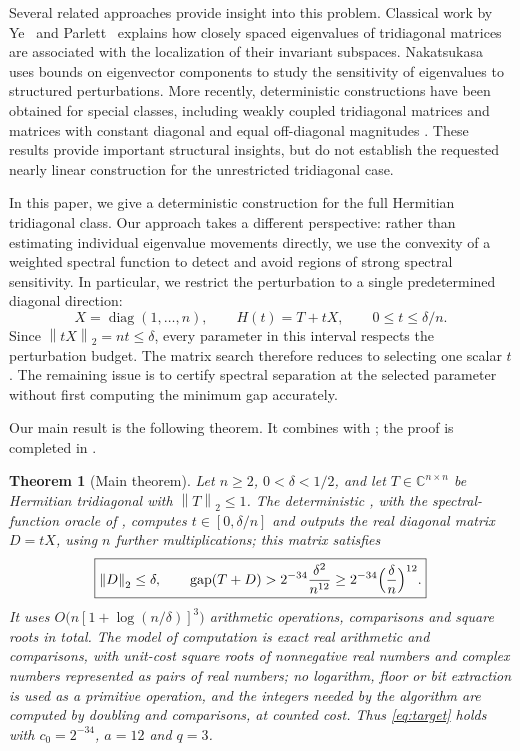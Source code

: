 \documentclass[10pt,a4paper]{article}
\newtheorem{theorem}{Theorem}[section]
\newcommand{\norm}[1]{\left\lVert #1\right\rVert}
\DeclareMathOperator{\gap}{gap}
\DeclareMathOperator{\diag}{diag}
\newcommand{\C}{\mathbb C}
\begin{document}
Several related approaches provide insight into this problem.
Classical work by Ye~\cite{Ye1995} and
Parlett~\cite{Parlett1996} explains how closely spaced
eigenvalues of tridiagonal matrices are associated with
the localization of their invariant subspaces.
Nakatsukasa~\cite{Nakatsukasa2012} uses bounds on
eigenvector components to study the sensitivity of
eigenvalues to structured perturbations.
More recently, deterministic constructions have been
obtained for special classes, including weakly coupled
tridiagonal matrices and matrices with constant diagonal
and equal off-diagonal magnitudes
\cite{CatalogueKE02}. These results provide important
structural insights, but do not establish the requested
nearly linear construction for the unrestricted
tridiagonal case.

In this paper, we give a deterministic construction for
the full Hermitian tridiagonal class. Our approach takes
a different perspective: rather than estimating individual
eigenvalue movements directly, we use the convexity of a
weighted spectral function to detect and avoid regions of
strong spectral sensitivity.
In particular, we restrict the perturbation to a
single predetermined diagonal direction:
\begin{equation}\label{eq:tilt}
\boxed{
X=\diag(1,\ldots,n),\qquad
H(t)=T+tX,\qquad 0\leq t\leq\delta/n.
}
\end{equation}
Since $\norm{tX}_2=nt\leq\delta$, every parameter in this
interval respects the perturbation budget. The matrix
search therefore reduces to selecting one scalar $t$.
The remaining issue is to certify spectral separation at
the selected parameter without first computing the
minimum gap accurately.

Our main result is the following theorem. It combines
 with ; the proof is
completed in .

\begin{theorem}[Main theorem]\label{thm:main}
Let $n\geq2$, $0<\delta<1/2$, and let $T\in\C^{n\times n}$ be
Hermitian tridiagonal with $\norm{T}_2\leq1$.
The deterministic , with the
spectral-function oracle of , computes
$t\in[0,\delta/n]$ and outputs the real diagonal matrix $D=tX$,
using $n$ further multiplications; this matrix satisfies
\begin{equation}\label{eq:main}
\boxed{
\norm{D}_2\leq\delta,
\qquad
\gap(T+D)>2^{-34}\frac{\delta^2}{n^{12}}
\geq2^{-34}\Bigl(\frac{\delta}{n}\Bigr)^{12}.
}
\end{equation}
It uses $O\bigl(n[1+\log(n/\delta)]^3\bigr)$ arithmetic
operations, comparisons and square roots in total.
The model of computation is exact real arithmetic and
comparisons, with unit-cost square roots of nonnegative real
numbers and complex numbers represented as pairs of real
numbers; no logarithm, floor or bit extraction is used as a
primitive operation, and the integers needed by the algorithm
are computed by doubling and comparisons, at counted cost. Thus \eqref{eq:target} holds with $c_0=2^{-34}$,
$a=12$ and $q=3$.
\end{theorem}
\end{document}
